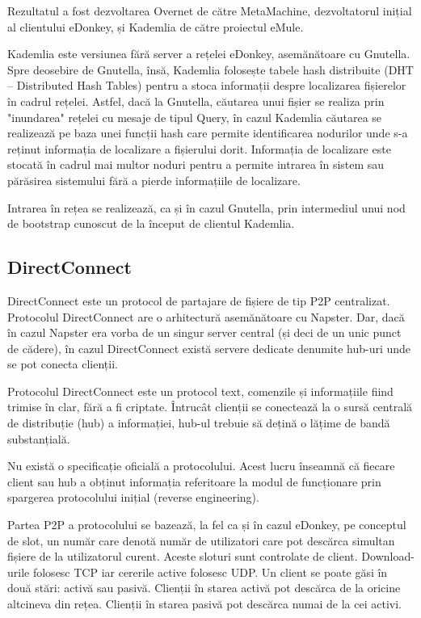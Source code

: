 Rezultatul a fost dezvoltarea Overnet de către MetaMachine, dezvoltatorul
inițial al clientului eDonkey, și Kademlia de către proiectul eMule.

Kademlia este versiunea fără server a rețelei eDonkey, asemănătoare cu
Gnutella. Spre deosebire de Gnutella, însă, Kademlia folosește tabele hash
distribuite (DHT – Distributed Hash Tables) pentru a stoca informații despre
localizarea fișierelor în cadrul rețelei. Astfel, dacă la Gnutella, căutarea
unui fișier se realiza prin "inundarea" rețelei cu mesaje de tipul Query, în
cazul Kademlia căutarea se realizează pe baza unei funcții hash care permite
identificarea nodurilor unde s-a reținut informația de localizare a fișierului
dorit. Informația de localizare este stocată în cadrul mai multor noduri
pentru a permite intrarea în sistem sau părăsirea sistemului fără a pierde
informațiile de localizare.

Intrarea în rețea se realizează, ca și în cazul Gnutella, prin intermediul
unui nod de bootstrap cunoscut de la început de clientul Kademlia.

\subsection{DirectConnect}

DirectConnect este un protocol de partajare de fișiere de tip P2P centralizat.
Protocolul DirectConnect are o arhitectură asemănătoare cu Napster. Dar, dacă
în cazul Napster era vorba de un singur server central (și deci de un unic
punct de cădere), în cazul DirectConnect există servere dedicate denumite
hub-uri unde se pot conecta clienții.

Protocolul DirectConnect este un protocol text, comenzile și informațiile
fiind trimise în clar, fără a fi criptate. Întrucât clienții se conectează la
o sursă centrală de distribuție (hub) a informației, hub-ul trebuie să dețină
o lățime de bandă substanțială.

Nu există o specificație oficială a protocolului. Acest lucru înseamnă că
fiecare client sau hub a obținut informația referitoare la modul de
funcționare prin spargerea protocolului inițial (reverse engineering).

Partea P2P a protocolului se bazează, la fel ca și în cazul eDonkey, pe
conceptul de slot, un număr care denotă număr de utilizatori care pot descărca
simultan fișiere de la utilizatorul curent. Aceste sloturi sunt controlate de
client. Download-urile folosesc TCP iar cererile active folosesc UDP. Un
client se poate găsi în două stări: activă sau pasivă. Clienții în starea
activă pot descărca de la oricine altcineva din rețea. Clienții în starea
pasivă pot descărca numai de la cei activi.

